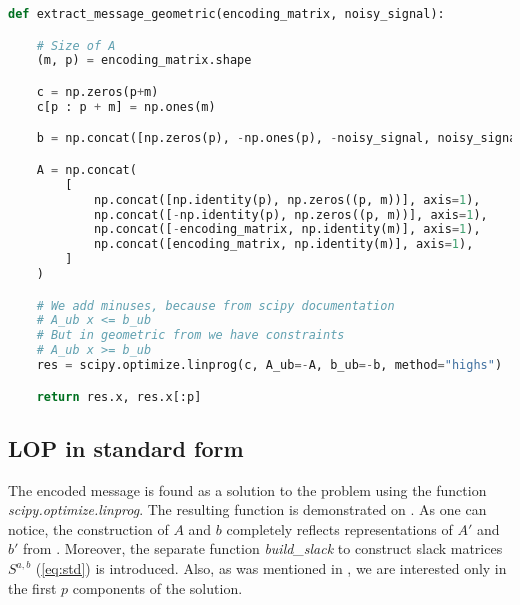 \documentclass{article}
\begin{document}
\begin{lstlisting}[language=Python, caption={Message decryption based on solution of LOP in geometric form. The output is tuple of solution of the problem, and decrypted message itself}, label={lst:geom}]
  def extract_message_geometric(encoding_matrix, noisy_signal):

    # Size of A
    (m, p) = encoding_matrix.shape

    c = np.zeros(p+m)
    c[p : p + m] = np.ones(m)

    b = np.concat([np.zeros(p), -np.ones(p), -noisy_signal, noisy_signal])

    A = np.concat(
        [
            np.concat([np.identity(p), np.zeros((p, m))], axis=1),
            np.concat([-np.identity(p), np.zeros((p, m))], axis=1),
            np.concat([-encoding_matrix, np.identity(m)], axis=1),
            np.concat([encoding_matrix, np.identity(m)], axis=1),
        ]
    )

    # We add minuses, because from scipy documentation
    # A_ub x <= b_ub
    # But in geometric from we have constraints
    # A_ub x >= b_ub
    res = scipy.optimize.linprog(c, A_ub=-A, b_ub=-b, method="highs")

    return res.x, res.x[:p]
\end{lstlisting}


\subsection{LOP in standard form}
The encoded message is found as a solution to the problem  using the function \textit{scipy.optimize.linprog}. The resulting function is demonstrated on . As one can notice, the construction of $A$ and $b$ completely reflects representations of $A'$ and $b'$ from .
Moreover, the separate function \textit{build\_slack} to construct slack matrices $S^{a,b}$ (\cref{eq:std}) is introduced.
Also, as was mentioned in , we are interested only in the first $p$ components of the solution.
\end{document}
